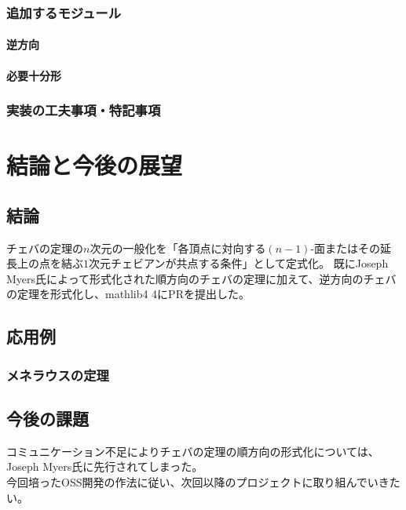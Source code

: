 \documentclass[a4paper,12pt]{bxjsbook}
\newlength{\customindent}
\newenvironment{body}{
  \par
  \begingroup
  \setlength{\leftskip}{\customindent}
  \setlength{\rightskip}{0pt}
  \setlength{\parindent}{1em}
  \setlength{\displayindent}{\customindent}
  \setlength{\displaywidth}{\dimexpr\linewidth-\customindent\relax}
}{
  \par
  \endgroup
}
\theoremstyle{theorem}
\begin{document}
    \subsection{追加するモジュール}
    \subsubsection{逆方向}

    \subsubsection{必要十分形}

    \subsection{実装の工夫事項・特記事項}
    \begin{bodydescription}
        \item %
    \end{bodydescription}

    \chapter{結論と今後の展望}

    \section{結論}
    \begin{body}
        \indent チェバの定理の$n$次元の一般化を「各頂点に対向する$(n-1)$-面またはその延長上の点を結ぶ$1$次元チェビアンが共点する条件」として定式化。
        既にJoseph Myers氏によって形式化された順方向のチェバの定理に加えて、逆方向のチェバの定理を形式化し、mathlib4 4にPRを提出した。
    \end{body}

    \section{応用例}
    \subsection{メネラウスの定理}

    \section{今後の課題}
    \begin{body}
        \indent コミュニケーション不足によりチェバの定理の順方向の形式化については、Joseph Myers氏に先行されてしまった。\\
        \indent 今回培ったOSS開発の作法に従い、次回以降のプロジェクトに取り組んでいきたい。\\
    \end{body}
\end{document}
